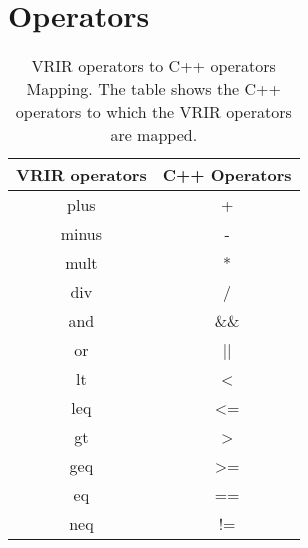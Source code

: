 \section{Operators}
\label{sec:operators}
			\begin{table}[htbp]
					\centering
					\begin{tabular}{|c|c|}
					\hline
					VRIR operators & C++ Operators \\ \hline
					plus           & +             \\ \hline
					minus          & -             \\ \hline
					mult           & *             \\ \hline
					div            & /             \\ \hline
					and            & \&\&           \\ \hline
					or             & ||            \\ \hline
					lt             & \textless     \\ \hline
					leq            & \textless=    \\ \hline
					gt             & \textgreater  \\ \hline
					geq            & \textgreater= \\ \hline
					eq             & ==            \\ \hline
					neq            & !=            \\ \hline
					\end{tabular}
					\caption[opMap]{VRIR operators to C++ operators Mapping. The table shows the C++ operators to which the VRIR operators are mapped.}
					\label{tab:opMap}
					\end{table}

